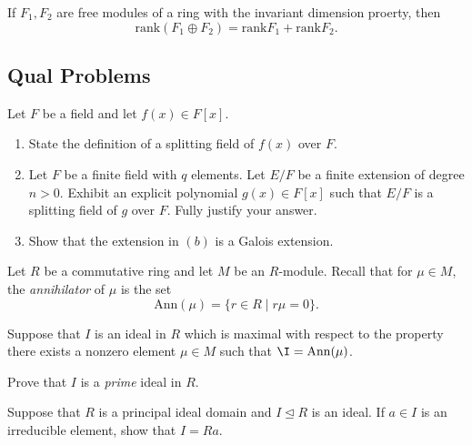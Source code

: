 \begin{problem}[Hungerford 4.2.9]
\label{prob:1.1}
If $F_1, F_2$ are free modules of a ring with the invariant dimension proerty, then 
\[
\mathrm{rank}(F_1 \oplus F_2) = \mathrm{rank} F_1 + \mathrm{rank} F_2.
\]
\end{problem}

\subsection{Qual Problems}

\begin{problem}
\label{prob:1.1}
Let $F$ be a field and let $f(x) \in F[x]$.
\begin{enumerate}
    \item State the definition of a splitting field of $f(x)$ over $F$.
    
    \item Let $F$ be a finite field with $q$ elements. Let $E/F$ be a finite extension of degree $n>0$. Exhibit an explicit polynomial $g(x) \in F[x]$ such that $E/F$ is a splitting field of $g$ over $F$. Fully justify your answer.
    
    \item Show that the extension in $(b)$ is a Galois extension.
\end{enumerate}
\end{problem}

\begin{problem}
\label{prob:1.1}
Let $R$ be a commutative ring and let $M$ be an $R$-module. Recall that for $\mu \in M$, the \textit{annihilator} of $\mu$ is the set 
\[
\mathrm{Ann}(\mu) = \{ r\in R \mid r\mu = 0\}.
\]

Suppose that $I$ is an ideal in $R$ which is maximal with respect to the property there exists a nonzero element $\mu \in M$ such that $\I = \mathrm{Ann}(\mu)$.

Prove that $I$ is a \textit{prime} ideal in $R$.

\end{problem}

\begin{problem}
\label{prob:1.1}
Suppose that $R$ is a principal ideal domain and $I \trianglelefteq R$ is an ideal. If $a\in I$ is an irreducible element, show that $I = Ra$.
\end{problem}